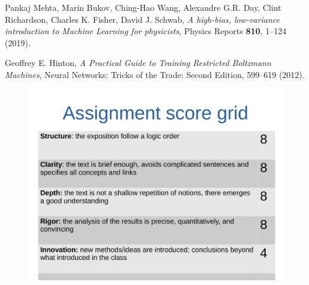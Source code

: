 \documentclass[prl,twocolumn]{revtex4-1}
\begin{document}
\begin{thebibliography}{99}

	Pankaj Mehta,
	Marin Bukov,
	Ching-Hao Wang,
	Alexandre G.R. Day,
	Clint Richardson,
	Charles K. Fisher,
	David J. Schwab,
	\textit{A high-bias, low-variance introduction to Machine Learning for physicists},
	Physics Reports {\bf 810}, 1--124 (2019).
  
	Geoffrey E. Hinton,
	\textit{A Practical Guide to Training Restricted Boltzmann Machines},
	Neural Networks: Tricks of the Trade: Second Edition, 599--619 (2012).

\end{thebibliography}

\clearpage

\begin{figure}[!tb]
  \centering
  \includegraphics[width=\textwidth]{description_assignment_LCPB_20-21.pdf}
\end{figure}
\end{document}
